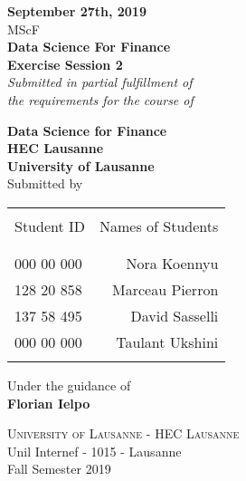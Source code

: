 \begin{titlepage}

\begin{center}

\textup{\small {\bf September 27th, 2019} \\ MScF}\\[0.2in]

\Large \textbf {Data Science For Finance \\ Exercise Session 2}\\[0.5in]

       \small \emph{Submitted in partial fulfillment of\\
        the requirements for the course of}
        \vspace{.2in}

       {\bf Data Science for Finance \\ HEC Lausanne \\ University of Lausanne}\\[0.5in]

\normalsize Submitted by \\
\begin{table}[h]
\centering
\begin{tabular}{lr}\hline \\
Student ID & Names of Students \\ \\ \hline
\\
000 00 000 & Nora Koennyu \\
128 20 858 & Marceau Pierron \\
137 58 495 & David Sasselli \\ 
000 00 000 & Taulant Ukshini \\ \\ \hline 
\end{tabular}
\end{table}

\vspace{.1in}
Under the guidance of\\
{\textbf{Florian Ielpo}}\\[0.2in]

\vfill

\normalsize
\textsc{University of Lausanne - HEC Lausanne}\\
Unil Internef - 1015 - Lausanne \\
\vspace{0.2cm}
Fall Semester 2019

\end{center}

\end{titlepage}
